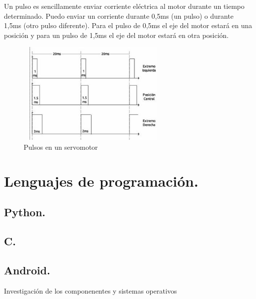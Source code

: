 Un pulso es sencillamente enviar corriente eléctrica al motor durante un tiempo determinado. Puedo enviar un corriente durante 0,5ms (un pulso) o durante 1,5ms (otro pulso diferente). Para el pulso de 0,5ms el eje del motor estará en una posición y para un pulso de 1,5ms el eje del motor estará en otra posición.

\begin{figure}[H]
\centering
\includegraphics[width=7.5cm, height=5cm]{./images/estado-arte/pulsos-servomotores.jpg}
\caption{Pulsos en un servomotor}
\label{fig:pulsos1}
\end{figure}


\section{Lenguajes de programación.}
\subsection{Python.}
\subsection{C.}
\subsection{Android.}
Investigación de los componenentes y sistemas operativos


